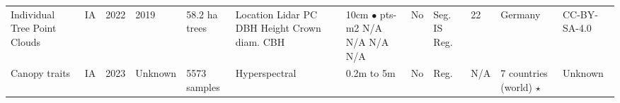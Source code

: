 \documentclass{CUP-JNL-DTM}%
\theoremstyle{definition}
\numberwithin{equation}{section}
\begin{document}
\begin{table*}[ht]
{\begin{fntable}
\begin{adjustwidth}{-0.8cm}{}
\begin{tabular}{p{1.4cm} | p{0.3cm} | p{0.4cm} | p{1cm} | p{1.4cm} | p{1.4cm} : p{1.5cm} | p{0.4cm} | p{0.7cm} | p{1cm} | p{1cm} | p{1.1cm}}
Individual Tree Point Clouds \cite{weiser_individual_2022} & IA & 2022 & 2019 & 58.2 ha  trees & Location \newline Lidar PC \newline DBH \newline Height \newline Crown diam. \newline CBH  &  10cm \newline $\bullet$ pts-m2 \newline N/A \newline N/A \newline N/A \newline N/A & No & Seg. \newline IS \newline Reg. & 22 & Germany & CC-BY-SA-4.0 \\


Canopy traits \cite{cherif_spectra_2023} & IA & 2023 & Unknown & 5573 samples & Hyperspectral & 0.2m to 5m & No & Reg. & N/A & 7 countries (world) $\star$ & Unknown \\


\end{tabular}
\end{adjustwidth}
\end{fntable}}
\end{table*}
\end{document}
